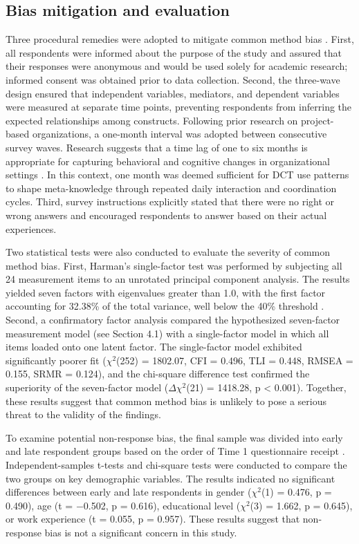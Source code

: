 \documentclass[authoryear,preprint,review,times,10pt]{elsarticle}
\begin{document}
\subsection{Bias mitigation and evaluation}
Three procedural remedies were adopted to mitigate common method bias \citep{podsakoff2003Common}. First, all respondents were informed about the purpose of the study and assured that their responses were anonymous and would be used solely for academic research; informed consent was obtained prior to data collection. Second, the three-wave design ensured that independent variables, mediators, and dependent variables were measured at separate time points, preventing respondents from inferring the expected relationships among constructs. Following prior research on project-based organizations, a one-month interval was adopted between consecutive survey waves. Research suggests that a time lag of one to six months is appropriate for capturing behavioral and cognitive changes in organizational settings \citep{carmeli2021Resilience, zaman2024Stress}. In this context, one month was deemed sufficient for DCT use patterns to shape meta-knowledge through repeated daily interaction and coordination cycles. Third, survey instructions explicitly stated that there were no right or wrong answers and encouraged respondents to answer based on their actual experiences.

Two statistical tests were also conducted to evaluate the severity of common method bias. First, Harman's single-factor test was performed by subjecting all 24 measurement items to an unrotated principal component analysis. The results yielded seven factors with eigenvalues greater than 1.0, with the first factor accounting for 32.38\% of the total variance, well below the 40\% threshold \citep{podsakoff2003Common}. Second, a confirmatory factor analysis compared the hypothesized seven-factor measurement model (see Section 4.1) with a single-factor model in which all items loaded onto one latent factor. The single-factor model exhibited significantly poorer fit ($\chi^{2}$(252) = 1802.07, CFI = 0.496, TLI = 0.448, RMSEA = 0.155, SRMR = 0.124), and the chi-square difference test confirmed the superiority of the seven-factor model ($\Delta\chi^{2}$(21) = 1418.28, p < 0.001). Together, these results suggest that common method bias is unlikely to pose a serious threat to the validity of the findings.

To examine potential non-response bias, the final sample was divided into early and late respondent groups based on the order of Time 1 questionnaire receipt \citep{armstrong1977Estimating}. Independent-samples t-tests and chi-square tests were conducted to compare the two groups on key demographic variables. The results indicated no significant differences between early and late respondents in gender ($\chi^{2}$(1) = 0.476, p = 0.490), age (t = $-$0.502, p = 0.616), educational level ($\chi^{2}$(3) = 1.662, p = 0.645), or work experience (t = 0.055, p = 0.957). These results suggest that non-response bias is not a significant concern in this study.
\end{document}
